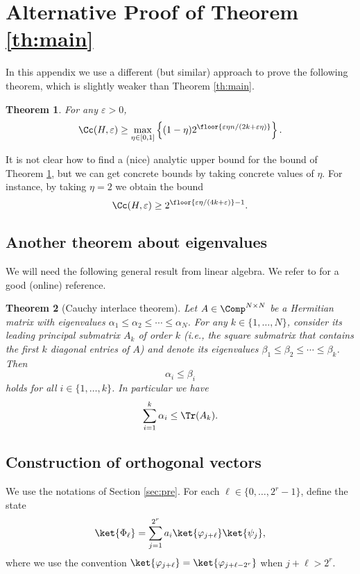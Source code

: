 \documentclass[11pt,a4paper]{article}
\theoremstyle{plain}
\newtheorem{theorem}{Theorem}
\theoremstyle{definition}
\begin{document}

\section{Alternative Proof of Theorem \ref{th:main}}
In this appendix we use a different (but similar) approach to prove the following theorem, which is slightly weaker than Theorem \ref{th:main}.
\begin{theorem}\label{th:main2}
	For any $\varepsilon>0$, 
	\[
	\Cc(H,\varepsilon)\ge \max_{\eta\in[0,1]}\left\{(1-\eta)2^{\floor{\varepsilon\eta n/(2k+\varepsilon\eta)}}\right\}.
	\]
\end{theorem}
It is not clear how to find a (nice) analytic upper bound for the bound of Theorem \ref{th:main2}, but we can get concrete bounds by taking concrete values of $\eta$. For instance, by taking $\eta=2$ we obtain the bound
\[
\Cc(H,\varepsilon)\ge 2^{\floor{\varepsilon\eta /(4k+\varepsilon)}-1}.
\]

\subsection{Another theorem about eigenvalues}
We will need the following general result from linear algebra. We refer to \cite{Higham} for a good (online) reference.
\begin{theorem}[Cauchy interlace theorem]\label{th:Cauchy}
	Let $A\in\Comp^{N\times N}$ be a Hermitian matrix with eigenvalues $\alpha_1\le\alpha_2\le\cdots\le\alpha_{N}$. For any $k\in\{1,\ldots, N\}$, consider its leading principal submatrix $A_k$ of order $k$ (i.e., the square submatrix that contains the first $k$ diagonal entries of $A$) and denote its eigenvalues $\beta_1\le\beta_2\le\cdots\le\beta_{k}$. Then 
	\[
	\alpha_i\le \beta_i
	\]
	holds for all $i\in\{1,\ldots,k\}$. In particular we have 
	\[
	\sum_{i=1}^k\alpha_i\le \Tr(A_k).
	\]
\end{theorem}

\subsection{Construction of orthogonal vectors}\label{sub:const}
We use the notations of Section \ref{sec:pre}.
For each $\ell\in \{0,\ldots,2^r-1\}$, define the state 
\[
\ket{\Phi_\ell}=\sum_{j=1}^{2^r}a_i\ket{\varphi_{j+\ell}}\ket{\psi_j},
\]
where we use the convention $\ket{\varphi_{j+\ell}}=\ket{\varphi_{j+\ell-2^r}}$ when $j+\ell>2^r$.
\end{document}
